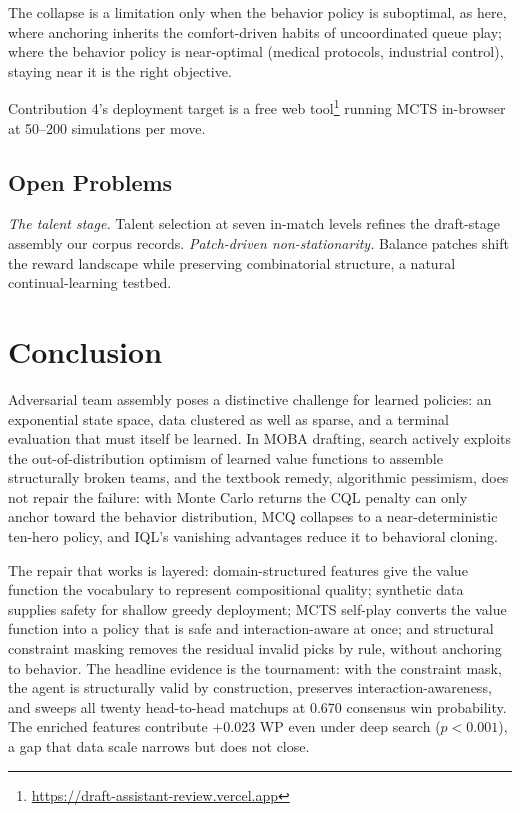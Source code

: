 \documentclass[journal]{IEEEtran}
\newcommand{\deployurl}{\url{https://draft-assistant-review.vercel.app}}
\newcommand{\deployurl}{\url{https://www.hotsfever.com}}
\begin{document}
The collapse is a limitation only when the behavior policy is suboptimal, as here, where anchoring inherits the comfort-driven habits of uncoordinated queue play; where the behavior policy is near-optimal (medical protocols, industrial control), staying near it is the right objective.

Contribution 4's deployment target is a free web tool\footnote{\deployurl} running MCTS in-browser at 50--200 simulations per move.

\subsection{Open Problems}
\label{sec:open}

\textit{The talent stage.} Talent selection at seven in-match levels refines the draft-stage assembly our corpus records. \textit{Patch-driven non-stationarity.} Balance patches shift the reward landscape while preserving combinatorial structure, a natural continual-learning testbed.
\section{Conclusion}

Adversarial team assembly poses a distinctive challenge for learned policies: an exponential state space, data clustered as well as sparse, and a terminal evaluation that must itself be learned. In MOBA drafting, search actively exploits the out-of-distribution optimism of learned value functions to assemble structurally broken teams, and the textbook remedy, algorithmic pessimism, does not repair the failure: with Monte Carlo returns the CQL penalty can only anchor toward the behavior distribution, MCQ collapses to a near-deterministic ten-hero policy, and IQL's vanishing advantages reduce it to behavioral cloning.

The repair that works is layered: domain-structured features give the value function the vocabulary to represent compositional quality; synthetic data supplies safety for shallow greedy deployment; MCTS self-play converts the value function into a policy that is safe and interaction-aware at once; and structural constraint masking removes the residual invalid picks by rule, without anchoring to behavior. The headline evidence is the tournament: with the constraint mask, the agent is structurally valid by construction, preserves interaction-awareness, and sweeps all twenty head-to-head matchups at 0.670 consensus win probability. The enriched features contribute +0.023 WP even under deep search ($p < 0.001$), a gap that data scale narrows but does not close.
\end{document}
